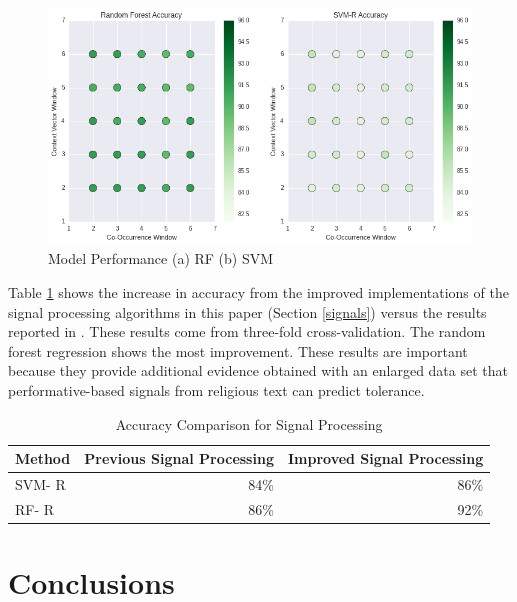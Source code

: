 \documentclass[11pt, a4paper]{article}
\begin{document}
\begin{figure}[!h]
\begin{center}
\includegraphics[width = .9\textwidth,keepaspectratio]{figs/RF_SVM_accuracy}
\caption{Model Performance (a) RF (b) SVM}
\label{fig:RF_SVM_accuracy}
\end{center}
\end{figure}


Table \ref{tab:accuracy} shows the increase in accuracy from the  improved implementations of the signal processing algorithms in this paper (Section \ref{signals}) versus the results reported in . These results come from three-fold cross-validation. The random forest regression shows the most improvement. These results are important because they provide additional evidence obtained with an enlarged data set that performative-based signals from religious text can predict tolerance. 

\begin{table}[ht]
\caption{Accuracy Comparison for Signal Processing}
\begin{center}
\begin{tabular}{lrr}
\hline
Method & Previous Signal Processing & Improved Signal Processing \\ \hline
SVM- R & 84\% & 86\% \\
RF- R 	& 86\% & 92\% \\ 
\end{tabular}
\end{center}
\label{tab:accuracy}
\end{table}%
 
\section{Conclusions}
\label{conclusions}
\end{document}
